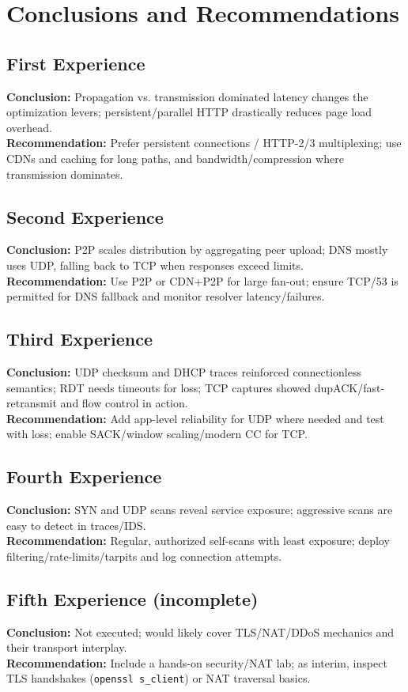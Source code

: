 
\section*{Conclusions and Recommendations}

\subsection*{First Experience}
\textbf{Conclusion:} Propagation vs. transmission dominated latency changes the optimization levers; persistent/parallel HTTP drastically reduces page load overhead.\\
\textbf{Recommendation:} Prefer persistent connections / HTTP-2/3 multiplexing; use CDNs and caching for long paths, and bandwidth/compression where transmission dominates.

\subsection*{Second Experience}
\textbf{Conclusion:} P2P scales distribution by aggregating peer upload; DNS mostly uses UDP, falling back to TCP when responses exceed limits.\\
\textbf{Recommendation:} Use P2P or CDN+P2P for large fan-out; ensure TCP/53 is permitted for DNS fallback and monitor resolver latency/failures.

\subsection*{Third Experience}
\textbf{Conclusion:} UDP checksum and DHCP traces reinforced connectionless semantics; RDT needs timeouts for loss; TCP captures showed dupACK/fast-retransmit and flow control in action.\\
\textbf{Recommendation:} Add app-level reliability for UDP where needed and test with loss; enable SACK/window scaling/modern CC for TCP.

\subsection*{Fourth Experience}
\textbf{Conclusion:} SYN and UDP scans reveal service exposure; aggressive scans are easy to detect in traces/IDS.\\
\textbf{Recommendation:} Regular, authorized self-scans with least exposure; deploy filtering/rate-limits/tarpits and log connection attempts.

\subsection*{Fifth Experience (incomplete)}
\textbf{Conclusion:} Not executed; would likely cover TLS/NAT/DDoS mechanics and their transport interplay.\\
\textbf{Recommendation:} Include a hands-on security/NAT lab; as interim, inspect TLS handshakes (\texttt{openssl s\_client}) or NAT traversal basics.

